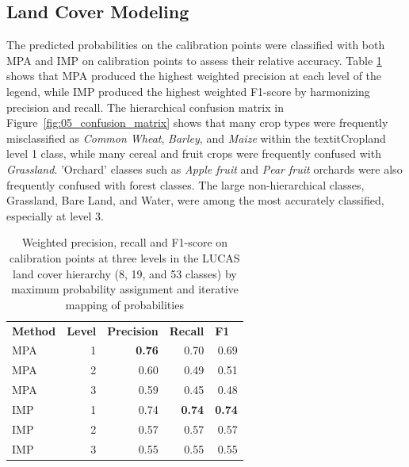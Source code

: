 \subsection{Land Cover Modeling}

    The predicted probabilities on the calibration points were classified with both MPA and IMP on calibration points to assess their relative accuracy. Table \ref{tab:05_calibration_accuracy} shows that MPA produced the highest weighted precision at each level of the legend, while IMP produced the highest weighted F1-score by harmonizing precision and recall. The hierarchical confusion matrix in Figure~\ref{fig:05_confusion_matrix} shows that many crop types were frequently misclassified as \textit{Common Wheat}, \textit{Barley}, and \textit{Maize} within the textit{Cropland} level 1 class, while many cereal and fruit crops were frequently confused with \textit{Grassland}. 'Orchard' classes such as \textit{Apple fruit} and \textit{Pear fruit} orchards were also frequently confused with forest classes. The large non-hierarchical classes, Grassland, Bare Land, and Water, were among the most accurately classified, especially at level 3.
    
    \begin{table}[]
    \begin{tabular}{lrrrr}
    \textbf{Method} & \multicolumn{1}{l}{\textbf{Level}} & \multicolumn{1}{l}{\textbf{Precision}} & \multicolumn{1}{l}{\textbf{Recall}} & \multicolumn{1}{l}{\textbf{F1}} \\
    MPA & 1 & \textbf{0.76} & 0.70 & 0.69 \\
    MPA & 2 & 0.60 & 0.49 & 0.51 \\
    MPA & 3 & 0.59 & 0.45 & 0.48 \\
    IMP & 1 & 0.74 & \textbf{0.74} & \textbf{0.74} \\
    IMP & 2 & 0.57 & 0.57 & 0.57 \\
    IMP & 3 & 0.55 & 0.55 & 0.55
    \end{tabular}
    \caption{Weighted precision, recall and F1-score on calibration points at three levels in the LUCAS land cover hierarchy (8, 19, and 53 classes) by maximum probability assignment and iterative mapping of probabilities}
    \label{tab:05_calibration_accuracy}
    \end{table}

